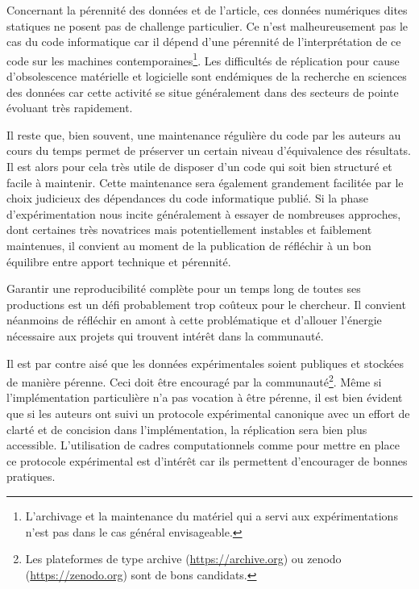 Concernant la pérennité des données et de l'article, ces données numériques dites \og statiques \fg ne posent pas de challenge particulier. Ce n'est malheureusement pas le cas du code informatique car il dépend d'une pérennité de l'interprétation de ce code sur les machines contemporaines\footnote{L'archivage et la maintenance du matériel qui a servi aux expérimentations n'est pas dans le cas général envisageable.}. Les difficultés de réplication pour cause d'obsolescence matérielle et logicielle sont endémiques de la recherche en sciences des données car cette activité se situe généralement dans des secteurs de pointe évoluant très rapidement.

Il reste que, bien souvent, une maintenance régulière du code par les auteurs au cours du temps permet de préserver un certain niveau d'équivalence des résultats. Il est alors pour cela très utile de disposer d'un code qui soit bien structuré et facile à maintenir. Cette maintenance sera également grandement facilitée par le choix judicieux des dépendances du code informatique publié. Si la phase d'expérimentation nous incite généralement à essayer de nombreuses approches, dont certaines très novatrices mais potentiellement instables et faiblement maintenues, il convient au moment de la publication de réfléchir à un bon équilibre entre apport technique et pérennité.

Garantir une reproducibilité complète pour un temps long de toutes ses productions est un défi probablement trop coûteux pour le chercheur. Il convient néanmoins de réfléchir en amont à cette problématique et d'allouer l'énergie nécessaire aux projets qui trouvent intérêt dans la communauté.

Il est par contre aisé que les données expérimentales soient publiques et stockées de manière pérenne. Ceci doit être encouragé par la communauté\footnote{Les plateformes de type archive (\url{https://archive.org}) ou zenodo (\url{https://zenodo.org}) sont de bons candidats.}. Même si l'implémentation particulière n'a pas vocation à être pérenne, il est bien évident que si les auteurs ont suivi un protocole expérimental canonique avec un effort de clarté et de concision dans l'implémentation, la réplication sera bien plus accessible. L'utilisation de cadres computationnels comme \explanes pour mettre en place ce protocole expérimental est d'intérêt car ils permettent d'encourager de bonnes pratiques.

